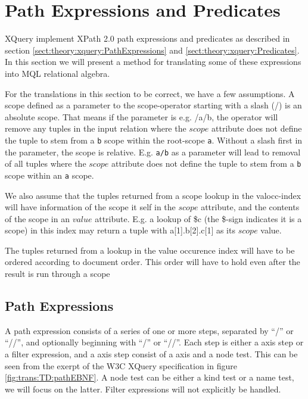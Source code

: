 \section{Path Expressions and Predicates}
\label{sect:trans:TD:pathNpred}

XQuery implement XPath 2.0 path expressions and predicates as described in section
\ref{sect:theory:xquery:PathExpressions} and \ref{sect:theory:xquery:Predicates}. In this section we will present
a method for translating some of these expressions into MQL relational algebra.

For the translations in this section to be correct, we have a few assumptions. A scope defined as a parameter to
the \textsf{scope}-operator starting with a slash (\textsf{/}) is an absolute scope. That means if the parameter
is e.g. \textsf{/a/b}, the operator will remove any tuples in the input relation where the $scope$ attribute does
not define the tuple to stem from a \texttt{b} scope within the root-scope \texttt{a}. Without a slash first in
the parameter, the scope is relative. E.g. \texttt{a/b} as a parameter will lead to removal of all tuples where
the $scope$ attribute does not define the tuple to stem from a \texttt{b} scope within an \texttt{a} scope.

We also assume that the tuples returned from a scope lookup in the \textsf{valocc}-index will have information of
the scope it self in the $scope$ attribute, and the contents of the scope in an $value$ attribute. E.g. a lookup of
\textsf{\$c} (the \textsf{\$}-sign indicates it is a scope) in this index may return a tuple with
\textsf{a[1].b[2].c[1]} as its $scope$ value.

The tuples returned from a lookup in the value occurence index will have to be ordered according to document
order. This order will have to hold even after the result is run through a \textsf{scope}


\subsection{Path Expressions}
\label{sect:trans:TD:pathExprs}
A path expression consists of a series of one or more steps, separated by ``/'' or ``//'', and optionally beginning
with ``/'' or ``//''.  Each step is either a axis step or a filter expression, and a axis step consist of a axis
and a node test. This can be seen from the exerpt of the W3C XQuery specification in figure \ref{fig:trans:TD:pathEBNF}.
A node test can be either a kind test or a name test, we will focus on the latter. Filter expressions will not
explicitly be handled.

